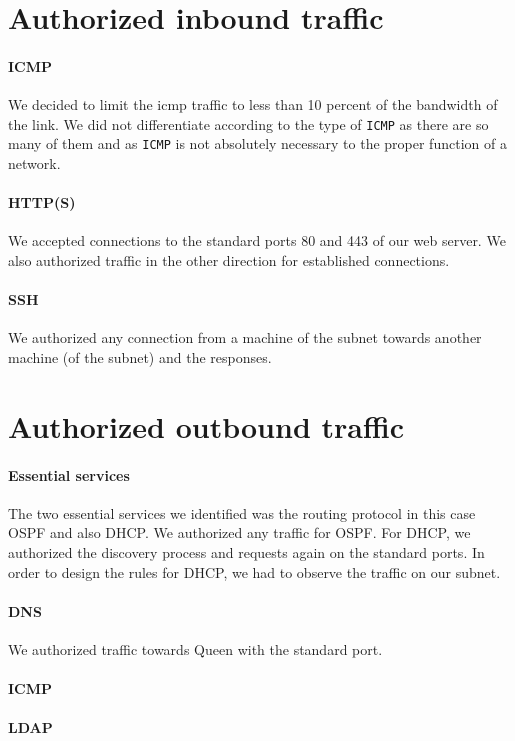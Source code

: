 \documentclass[a4paper,titlepage]{article}
\begin{document}
\section{Authorized inbound traffic}
\paragraph{ICMP} We decided to limit the icmp traffic to less than 10 percent of the bandwidth of the link. We did not differentiate according to the type of \texttt{ICMP} as there are so many of them and as \texttt{ICMP} is not absolutely necessary to the proper function of a network.

\paragraph{HTTP(S)} We accepted connections to the standard ports 80 and 443 of our web server. We also authorized traffic in the other direction for established connections.

\paragraph{SSH} We authorized any connection from a machine of the subnet towards another machine (of the subnet) and the responses.

\section{Authorized outbound traffic}
\paragraph{Essential services} The two essential services we identified was the routing protocol in this case OSPF and also DHCP. We authorized any traffic for OSPF. For DHCP, we authorized the discovery process and requests again on the standard ports. In order to design the rules for DHCP, we had to observe the traffic on our subnet. 

\paragraph{DNS} We authorized traffic towards Queen with the standard port.

\paragraph{ICMP}
\paragraph{LDAP}
\end{document}
